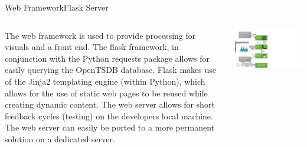 \documentclass[8pt,xcolor={dvipsnames}]{beamer}
\begin{document}
{%
%
%
%


\begin{frame}{Web Framework}{Flask Server}

\begin{columns}
	\begin{column}{0.4\textwidth}
		
		The web framework is used to provide processing for visuals and a front end. The flask framework, in conjunction with the Python requests package allows for easily querying the OpenTSDB database.
		Flask makes use of the Jinja2 templating engine (within Python), which allows for the use of static web pages to be reused while creating dynamic content.
		The web server allows for short feedback cycles (testing) on the developers local machine. The web server can easily be ported to a more permanent solution on a dedicated server.
		
	\end{column}
	\begin{column}{0.6\textwidth}  
			\begin{center}
			\includegraphics[width=\textwidth, trim=0 0 490 30, clip]{FlaskDiagram}
		\end{center}
	\end{column}
\end{columns}


\end{frame}}
\end{document}
